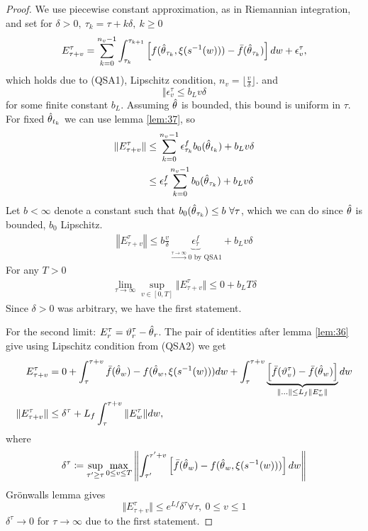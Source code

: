 \begin{proof}
    We use piecewise constant approximation, as in Riemannian integration, and set for \(\delta>0,\ \tau_k=\tau+k\delta,\ k\geq 0\) 
    \begin{align*}
        E_{\tau+v}^\tau=\sum_{k=0}^{n_v-1}\int_{\tau_k}^{\tau_{k+1}} \left[f({\hat{\theta}}_{\tau_k},\xi(s^{-1}(w)))-\bar{f}({\hat{\theta}}_{\tau_k})\right]dw +\epsilon_{v}^\tau,
    \end{align*}
    which holds due to (QSA1), Lipschitz condition, \(n_v=\lfloor \frac{v}{\delta}\rfloor\).
    and \[\Vert \epsilon_v^\tau\leq b_L v\delta\]
    for some finite constant \(b_L\). Assuming \({\hat{\theta}}\) is bounded, this bound is uniform in \(\tau\).
    For fixed \({\hat{\theta}}_{t_k}\) we can use lemma \ref{lem:37}, so 
    \begin{align*}
        \Vert E_{\tau+v}^\tau\Vert &\leq \sum_{k=0}^{n_v-1}\epsilon_{\tau_k}^fb_0({\hat{\theta}}_{t_k})+b_L v\delta\\
        &\leq \epsilon_\tau^f\sum_{k=0}^{n_v-1} b_0({\hat{\theta}}_{\tau_k})+b_L v\delta
    \end{align*}
    Let \(b<\infty\) denote a constant such that \(b_0({\hat{\theta}}_{\tau_k})\leq b\ \forall \tau\), which we can do since \({\hat{\theta}}\) is bounded, \(b_0\) Lipschitz.
    \begin{align*}
        \left\Vert E_{\tau+v}^\tau\right\Vert\leq b \frac{v}{\delta}\underbrace{\epsilon_\tau^f}_{\stackrel{\tau\to\infty}{\to }0\text{ by QSA1}}+b_Lv\delta
    \end{align*}
    For any \(T>0\)
    \begin{align*}
        \lim_{\tau\to\infty}\sup_{v\in [0,T]}\Vert E_{\tau+v}^\tau\Vert \leq 0+ b_L T\delta
    \end{align*}
    Since \(\delta>0\) was arbitrary, we have the first statement.


    For the second limit: \(E_r^\tau=\vartheta_r^\tau-{\hat{\theta}}_r\). The pair of identities after lemma \ref{lem:36} give 
    using Lipschitz condition from (QSA2) we get
    \begin{align*}
        E_{\tau+v}^\tau&=0+\int_{\tau}^{\tau+v}\bar{f}({\hat{\theta}}_w)-f({\hat{\theta}}_w,\xi(s^{-1}(w)))dw + \int_\tau^{\tau+v}\underbrace{\left[\bar{f}(\vartheta_v^\tau)-\bar{f}({\hat{\theta}}_w)\right]}_{\Vert \dots \Vert \leq L_f \Vert E_w^\tau\Vert}dw\\
        \Vert E_{\tau+v}^\tau\Vert&\leq \delta^\tau+L_f \int_{\tau}^{\tau+v}\Vert E_w^\tau\Vert dw,
    \end{align*}
    where \[\delta^\tau\coloneqq \sup_{\tau'\geq \tau}\max_{0\leq v\leq T}\left\Vert \int_{\tau'}^{\tau'+v}\left[\bar{f}({\hat{\theta}}_w)-f({\hat{\theta}}_w,\xi(s^{-1}(w)))\right]dw\right\Vert\]    
    Grönwalls lemma gives 
    \[\Vert E_{\tau+v}^\tau\Vert \leq e^{Lf}\delta^\tau\forall \tau, \ 0\leq v\leq 1\]
    \(\delta^\tau\to 0\) for \(\tau\to\infty\) due to the first statement.
\end{proof}

